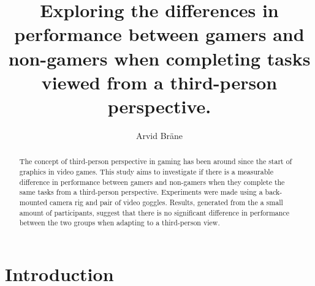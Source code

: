 \documentclass[runningheads,a4paper,oribibl]{llncs}
\begin{document}
\pagestyle{headings}

\mainmatter

\title{Exploring the differences in performance between gamers and non-gamers when completing tasks viewed from a third-person perspective.}



\author{Arvid Bräne}


\maketitle


\begin{abstract}
The concept of third-person perspective in gaming has been around since the start of graphics in video games. This study aims to investigate if there is a measurable difference in performance between gamers and non-gamers when they complete the same tasks from a third-person perspective. Experiments were made using a back-mounted camera rig and pair of video goggles. Results, generated from the a small amount of participants, suggest that there is no significant difference in performance between the two groups when adapting to a third-person view.
	


\end{abstract}











\section{Introduction}
\end{document}
